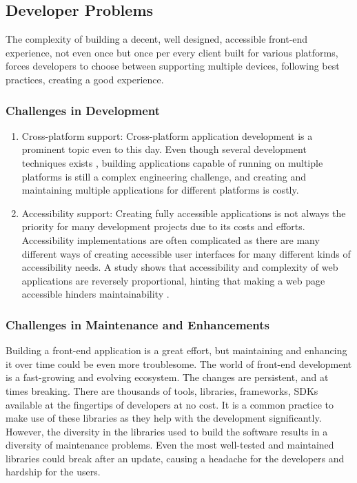 \subsection{Developer Problems}

The complexity of building a decent, well designed, accessible front-end experience, not even once but once per every client built for various platforms, forces developers to choose between supporting multiple devices, following best practices, creating a good experience.

\subsubsection{Challenges in Development}
\begin{enumerate}
  \item Cross-platform support:
  Cross-platform application development is a prominent topic even to this day. Even though several development techniques exists \cite{PWAs}, building applications capable of running on multiple platforms is still a complex engineering challenge, and creating and maintaining multiple applications for different platforms is costly. 
  \item Accessibility support:
  Creating fully accessible applications is not always the priority for many development projects due to its costs and efforts. Accessibility implementations are often complicated as there are many different ways of creating accessible user interfaces for many different kinds of accessibility needs. A study shows that accessibility and complexity of web applications are reversely proportional, hinting that making a web page accessible hinders maintainability \cite{WebNotForAll}.
\end{enumerate}

\subsubsection{Challenges in Maintenance and Enhancements}
Building a front-end application is a great effort, but maintaining and enhancing it over time could be even more troublesome. The world of front-end development is a fast-growing and evolving ecosystem. The changes are persistent, and at times breaking. There are thousands of tools, libraries, frameworks, SDKs available at the fingertips of developers at no cost. It is a common practice to make use of these libraries as they help with the development significantly. However, the diversity in the libraries used to build the software results in a diversity of maintenance problems. Even the most well-tested and maintained libraries could break after an update, causing a headache for the developers and hardship for the users.


